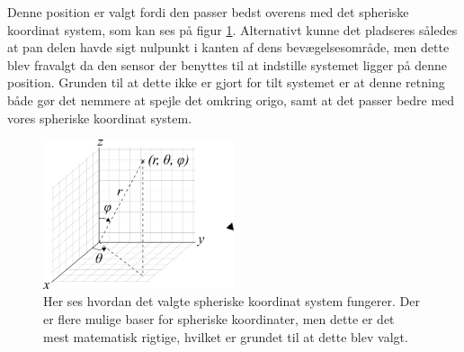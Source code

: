 Denne position er valgt fordi den passer bedst overens med det spheriske koordinat system, som kan ses på figur \ref{fig:Spherical}. Alternativt kunne det pladseres således at pan delen havde sigt nulpunkt i kanten  af dens bevægelsesområde, men dette blev fravalgt da den sensor der benyttes til at indstille systemet ligger på denne position. Grunden til at dette ikke er gjort for tilt systemet er at denne retning både gør det nemmere at spejle det omkring origo, samt at det passer bedre med vores spheriske koordinat system.

\begin{figure}[!ht]
	\begin{center}
		\includegraphics[width=0.5\textwidth]{Billeder/Spherical.png}
	\end{center}		
	\caption{Her ses hvordan det valgte spheriske koordinat system fungerer. Der er flere mulige baser for spheriske koordinater, men dette er det mest matematisk rigtige, hvilket er grundet til at dette blev valgt.}
	\label{fig:Spherical}
\end{figure}

